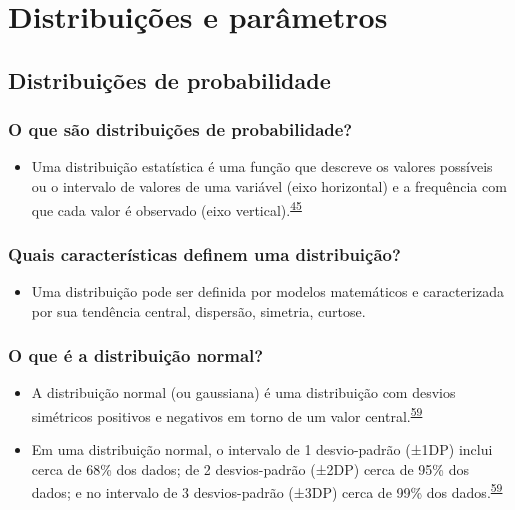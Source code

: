\documentclass[
  a4paper,
]{book}
\providecommand{\tightlist}{%
  \setlength{\itemsep}{0pt}\setlength{\parskip}{0pt}}
\begin{document}
\hypertarget{distribuicoes-parametros}{%
\chapter{\texorpdfstring{\textbf{Distribuições e parâmetros}}{Distribuições e parâmetros}}\label{distribuicoes-parametros}}

\hypertarget{distribuicoes}{%
\section{Distribuições de probabilidade}\label{distribuicoes}}

\hypertarget{o-que-suxe3o-distribuiuxe7uxf5es-de-probabilidade}{%
\subsection{O que são distribuições de probabilidade?}\label{o-que-suxe3o-distribuiuxe7uxf5es-de-probabilidade}}

\begin{itemize}
\tightlist
\item
  Uma distribuição estatística é uma função que descreve os valores possíveis ou o intervalo de valores de uma variável (eixo horizontal) e a frequência com que cada valor é observado (eixo vertical).\textsuperscript{\protect\hyperlink{ref-vetter2017}{45}}
\end{itemize}

\hypertarget{quais-caracteruxedsticas-definem-uma-distribuiuxe7uxe3o}{%
\subsection{Quais características definem uma distribuição?}\label{quais-caracteruxedsticas-definem-uma-distribuiuxe7uxe3o}}

\begin{itemize}
\tightlist
\item
  Uma distribuição pode ser definida por modelos matemáticos e caracterizada por sua tendência central, dispersão, simetria, curtose.
\end{itemize}

\hypertarget{o-que-uxe9-a-distribuiuxe7uxe3o-normal}{%
\subsection{O que é a distribuição normal?}\label{o-que-uxe9-a-distribuiuxe7uxe3o-normal}}

\begin{itemize}
\item
  A distribuição normal (ou gaussiana) é uma distribuição com desvios simétricos positivos e negativos em torno de um valor central.\textsuperscript{\protect\hyperlink{ref-Ali2016}{59}}
\item
  Em uma distribuição normal, o intervalo de 1 desvio-padrão (±1DP) inclui cerca de 68\% dos dados; de 2 desvios-padrão (±2DP) cerca de 95\% dos dados; e no intervalo de 3 desvios-padrão (±3DP) cerca de 99\% dos dados.\textsuperscript{\protect\hyperlink{ref-Ali2016}{59}}
\end{itemize}
\end{document}
